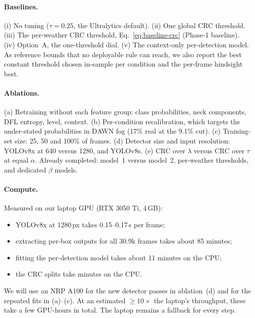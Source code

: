 \paragraph{Baselines.} (i) No tuning ($\tau = 0.25$, the Ultralytics default). (ii) One global CRC threshold.
(iii) The per-weather CRC threshold, Eq.~\eqref{eq:baseline-crc} (Phase-1 baseline). (iv) Option~A, the one-threshold
dial. (v) The context-only per-detection model. As reference bounds that no deployable rule can reach, we also
report the best constant threshold chosen in-sample per condition and the per-frame hindsight best.

\paragraph{Ablations.} (a) Retraining without each feature group: class probabilities, neck components, DFL
entropy, level, context. (b) Per-condition recalibration, which targets the under-stated probabilities in DAWN fog
(17\% real at the 9.1\% cut). (c) Training-set size: 25, 50 and 100\% of frames. (d) Detector size and input
resolution: YOLOv8x at 640 versus 1280, and YOLOv8s. (e) CRC over $\lambda$ versus CRC over $\tau$ at equal
$\alpha$. Already completed: model~1 versus model~2, per-weather thresholds, and dedicated $\beta$ models.

\paragraph{Compute.} Measured on our laptop GPU (RTX 3050 Ti, 4\,GB):
\begin{itemize}
  \item YOLOv8x at 1280\,px takes 0.15--0.17\,s per frame;
  \item extracting per-box outputs for all 30.9k frames takes about 85 minutes;
  \item fitting the per-detection model takes about 11 minutes on the CPU;
  \item the CRC splits take minutes on the CPU.
\end{itemize}
We will use an NRP A100 for the new detector passes in ablation~(d) and for the repeated fits in (a)--(c).
At an estimated $\ge 10\times$ the laptop's throughput, these take a few GPU-hours in total. The laptop
remains a fallback for every step.
